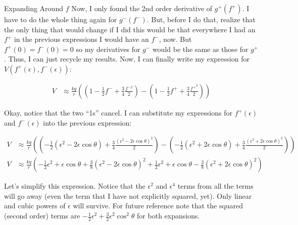 \begin{homeworkProblem}[Quiz 4]
\begin{homeworkSection}{Expanding Around $f$}
    Now, I only found the 2nd order derivative of $g^+(f^+)$. I have to
    do the whole thing again for $g^-(f^-)$. But, before I do that,
    realize that the only thing that would change if I did this would be
    that everywhere I had an $f^+$ in the previous expressions I would
    have an $f^-$, now. But $f^+(0) = f^-(0) = 0$ so my derivatives for
    $g^-$ would be the same as those for $g^+$. Thus, I can just recycle
    my results. Now, I can finally write my expression for $V\left(
    f^+(\epsilon),f^-(\epsilon) \right)$:

    \begin{align}
        \label{}
        V &\approx \frac{k q }{r} \left( 
        \left( 1 -\frac{1}{2} f^- + \frac{3}{4} 
        \frac{{f^-}^2}{2} \right)
        -
        \left( 1 - \frac{1}{2}f^+ + \frac{3}{4}
        \frac{{f^+}^2}{2}  \right)
        \right)
        \nonumber
    \end{align}

    Okay, notice that the two ``1s'' cancel. I can substitute my
    expressions for $f^+(\epsilon)$ and $f^-(\epsilon)$ into the
    previous expression:

    \begin{align}
        \label{}
        V &\approx \frac{k q }{r}
        \left(
            \left(
                -\frac{1}{2}
                \left( \epsilon^2 -2\epsilon\cos\theta
                \right)
                +\frac{3}{4}
                \frac{\left(\epsilon^2 -2\epsilon\cos\theta \right)^2}{2}
            \right)
            -\left( 
                -\frac{1}{2}(\epsilon^2 + 2\epsilon\cos\theta)+ \frac{3}{4}
                \frac{\left(\epsilon^2+2\epsilon\cos\theta \right)^2}{2}
            \right)
        \right) \nonumber \\
        V &\approx \frac{k q }{r}
        \left(
            -\frac{1}{2}\epsilon^2 + \epsilon\cos\theta+ \frac{3}{8}
            \left(
                \epsilon^2 - 2\epsilon\cos\theta
            \right)^2  
            +\frac{1}{2} \epsilon^2 +\epsilon\cos\theta -\frac{3}{8}
            \left(\epsilon^2 +2\epsilon\cos\theta
            \right)^2
        \right) \nonumber
    \end{align}

    Let's simplify this expression. Notice that the $\epsilon^2$ and
    $\epsilon^4$ terms from all the terms will go away (even the term
    that I have not explicitly squared, yet). Only linear and cubic
    powers of $\epsilon$ will survive. For future reference note that
    the squared (second order) terms are $-\frac{1}{2}\epsilon^2+ 
    \frac{3}{2}\epsilon^2\cos^2\theta$ for both expansions.


\end{homeworkSection}
\end{homeworkProblem}
